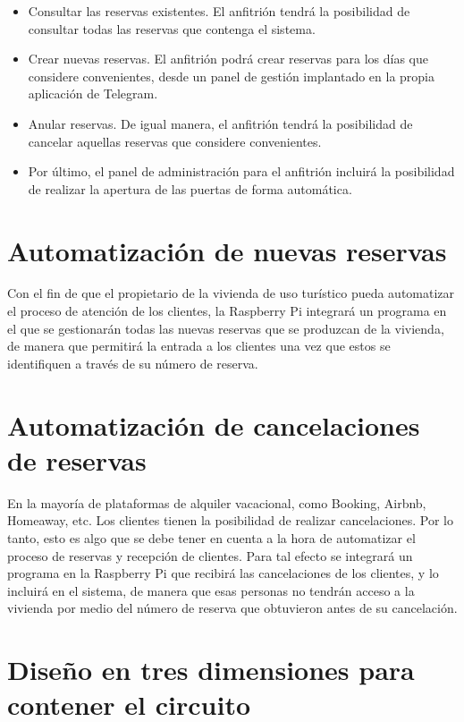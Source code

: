 \begin{itemize}
\item Consultar las reservas existentes. El anfitrión tendrá la posibilidad de consultar todas las reservas que contenga el sistema.
\item Crear nuevas reservas. El anfitrión podrá crear reservas para los días que considere convenientes, desde un panel de gestión implantado en la propia aplicación de Telegram.
\item Anular reservas. De igual manera, el anfitrión tendrá la posibilidad de cancelar aquellas reservas que considere convenientes.
\item Por último, el panel de administración para el anfitrión incluirá la posibilidad de realizar la apertura de las puertas de forma automática.
\end{itemize}

\section{Automatización de nuevas reservas} 
\label{sec:automatizacion-de-nuevas-reservas}

\noindent Con el fin de que el propietario de la vivienda de uso turístico pueda automatizar el proceso de atención de los clientes, la Raspberry Pi integrará un programa  en el que se gestionarán todas las nuevas reservas que se produzcan de la vivienda, de manera que permitirá la entrada a los clientes una vez que estos se identifiquen a través de su número de reserva.

\section{Automatización de cancelaciones de reservas} 
\label{sec:automatizacion-de-cancelaciones-de-reservas}

\noindent En la mayoría de plataformas de alquiler vacacional, como Booking, Airbnb, Homeaway, etc. Los clientes tienen la posibilidad de realizar cancelaciones. Por lo tanto, esto es algo que se debe tener en cuenta a la hora de automatizar el proceso de reservas y recepción de clientes. Para tal efecto se integrará un programa en la Raspberry Pi que recibirá las cancelaciones de los clientes, y lo incluirá en el sistema, de manera que esas personas no tendrán acceso a la vivienda por medio del número de reserva que obtuvieron antes de su cancelación.

\section{Diseño en tres dimensiones para contener el circuito} 
\label{sec:creacion-de-un-diseño-en-tres-dimensiones-para-contener-el-circuito}

